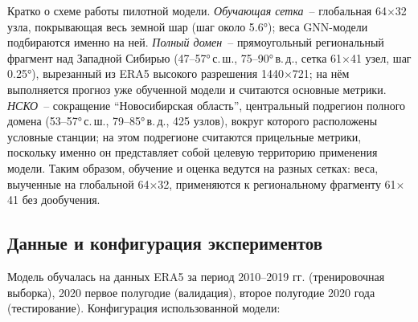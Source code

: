 \documentclass[14pt,a4paper]{extarticle}
\numberwithin{table}{section}
\numberwithin{figure}{section}
\numberwithin{equation}{section}
\begin{document}
Кратко о схеме работы пилотной модели. \emph{Обучающая сетка}~--
глобальная 64$\times$32 узла, покрывающая весь земной шар (шаг около
5.6°); веса GNN-модели подбираются именно на ней. \emph{Полный домен}~--
прямоугольный региональный фрагмент над Западной Сибирью
(47--57°\,с.\,ш., 75--90°\,в.\,д., сетка 61$\times$41 узел, шаг 0.25°),
вырезанный из ERA5 высокого разрешения 1440$\times$721; на нём
выполняется прогноз уже обученной модели и считаются основные метрики.
\emph{НСКО}~-- сокращение ``Новосибирская область'', центральный
подрегион полного домена (53--57°\,с.\,ш., 79--85°\,в.\,д., 425 узлов),
вокруг которого расположены условные станции; на этом подрегионе
считаются прицельные метрики, поскольку именно он представляет собой
целевую территорию применения модели. Таким образом, обучение и оценка
ведутся на разных сетках: веса, выученные на глобальной 64$\times$32,
применяются к региональному фрагменту 61$\times$41 без дообучения.

\subsection{Данные и конфигурация экспериментов}\label{ux434ux430ux43dux43dux44bux435-ux438-ux43aux43eux43dux444ux438ux433ux443ux440ux430ux446ux438ux44f-ux44dux43aux441ux43fux435ux440ux438ux43cux435ux43dux442ux43eux432}

Модель обучалась на данных ERA5 за период 2010--2019 гг. (тренировочная
выборка), 2020 первое полугодие (валидация), второе полугодие 2020 года
(тестирование). Конфигурация использованной модели:
\end{document}

